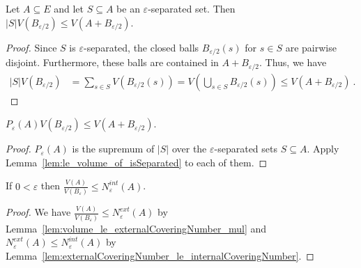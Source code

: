 \begin{lemma}\label{lem:le_volume_of_isSeparated}
  \leanok
Let $A \subseteq E$ and let $S \subseteq A$ be an $\varepsilon$-separated set.
Then $\vert S \vert V(B_{\varepsilon/2}) \le V(A + B_{\varepsilon/2})$.
\end{lemma}

\begin{proof}\leanok
Since $S$ is $\varepsilon$-separated, the closed balls $B_{\varepsilon/2}(s)$ for $s \in S$ are pairwise disjoint.
Furthermore, these balls are contained in $A + B_{\varepsilon/2}$.
Thus, we have
\begin{align*}
  \vert S \vert V(B_{\varepsilon/2})
  &= \sum_{s \in S} V(B_{\varepsilon/2}(s))
  = V(\bigcup_{s \in S} B_{\varepsilon/2}(s))
  \le V(A + B_{\varepsilon/2})
  \: .
\end{align*}
\end{proof}


\begin{lemma}\label{lem:packingNumber_mul_le_volume}
  \leanok
$P_\varepsilon(A) V(B_{\varepsilon/2}) \le V(A + B_{\varepsilon/2})$.
\end{lemma}

\begin{proof}\leanok
$P_\varepsilon(A)$ is the supremum of $\vert S \vert$ over the $\varepsilon$-separated sets $S \subseteq A$. Apply Lemma~\ref{lem:le_volume_of_isSeparated} to each of them.
\end{proof}


\begin{lemma}\label{lem:volume_div_le_internalCoveringNumber}
  \leanok
If $0 < \varepsilon$ then $\frac{V(A)}{V(B_\varepsilon)} \le N^{int}_\varepsilon(A)$.
\end{lemma}

\begin{proof}\leanok
We have $\frac{V(A)}{V(B_\varepsilon)} \le N^{ext}_\varepsilon(A)$ by Lemma~\ref{lem:volume_le_externalCoveringNumber_mul} and $N^{ext}_\varepsilon(A) \le N^{int}_\varepsilon(A)$ by Lemma~\ref{lem:externalCoveringNumber_le_internalCoveringNumber}.
\end{proof}


